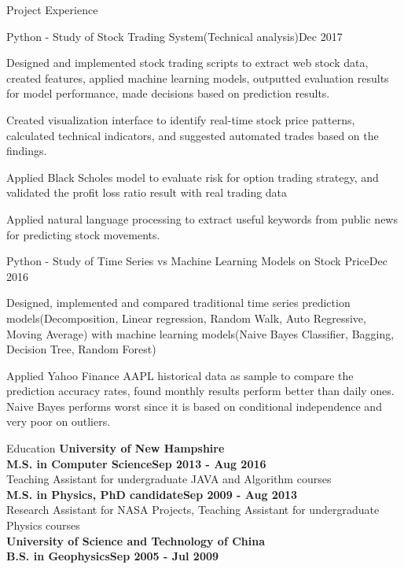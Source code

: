 \documentclass{resume} %
\begin{document}
\begin{rSection}{Project Experience}


\begin{rSubsection}{Python - Study of Stock Trading System(Technical analysis)}{Dec 2017}{}
\item Designed and implemented stock trading scripts to extract web stock data, created features, applied machine learning models, outputted evaluation results for model performance, made decisions based on prediction results.
\item Created visualization interface to identify real-time stock price patterns, calculated technical indicators, and suggested automated trades based on the findings.
\item Applied Black Scholes model to evaluate risk for option trading strategy, and validated the profit loss ratio result with real trading data
\item Applied natural language processing to extract useful keywords from public news for predicting stock movements.
\end{rSubsection}

\begin{rSubsection}{Python - Study of Time Series vs Machine Learning Models on Stock Price}{Dec 2016}{}
\item Designed, implemented and compared traditional time series prediction models(Decomposition, Linear regression, Random Walk, Auto Regressive, Moving Average) with machine learning models(Naive Bayes Classifier, Bagging, Decision Tree, Random Forest)
\item Applied Yahoo Finance AAPL historical data as sample to compare the prediction accuracy rates, found monthly results perform better than daily ones. Naive Bayes performs worst since it is based on conditional independence and very poor on outliers.
\end{rSubsection}



\end{rSection}




\begin{rSection}{Education}
{\bf University of New Hampshire}\\
{\bf M.S. in Computer Science}\hfill{\bf Sep 2013 - Aug 2016}\\
Teaching Assistant for undergraduate JAVA and Algorithm courses\\
{\bf M.S. in Physics, PhD candidate}\hfill{\bf Sep 2009 - Aug 2013}\\
Research Assistant for NASA Projects, Teaching Assistant for undergraduate Physics courses\\
{\bf University of Science and Technology of China}\\
{\bf B.S. in Geophysics}\hfill{\bf Sep 2005 - Jul 2009}
\end{rSection}
\end{document}
